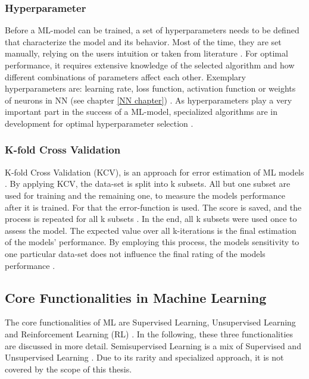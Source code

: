 \subsubsection*{Hyperparameter}
Before a ML-model can be trained, a set of hyperparameters needs to be defined that characterize the model and its behavior.
Most of the time, they are set manually, relying on the users intuition or taken from literature \cite{Philipp}. 
For optimal performance, it requires extensive knowledge of the selected algorithm and how different combinations of parameters affect each other. 
Exemplary hyperparameters are: learning rate, loss function, activation function or weights of neurons in NN (see chapter \ref{NN chapter}) \cite{Yang2}.
As hyperparameters play a very important part in the success of a ML-model, specialized algorithms are in development for optimal hyperparameter selection \cite{Bergstra}.


\subsubsection*{K-fold Cross Validation}\label{KCV}
K-fold Cross Validation (KCV), is an approach for error estimation of ML models \cite{Zhang}. By applying KCV, the data-set is split into k subsets. All but one subset are used for training and the remaining one, to measure the models performance after it is trained. For that the error-function is used. The score is saved, and the process is repeated for all k subsets \cite{Yoshua}. In the end, all k subsets were used once to assess the model. The expected value over all k-iterations is the final estimation of the models' performance. By employing this process, the models sensitivity to one particular data-set does not influence the final rating of the models performance \cite{Bishop}.





\subsection{Core Functionalities in Machine Learning}
The core functionalities of ML are Supervised Learning, Unsupervised Learning and Reinforcement Learning (RL) \cite{Theodoridis,Janiesch}. In the following, these three functionalities are discussed in more detail.
Semisupervised Learning is a mix of Supervised and Unsupervised Learning \cite{Zhu}. Due to its rarity and specialized approach, it is not covered by the scope of this thesis.

